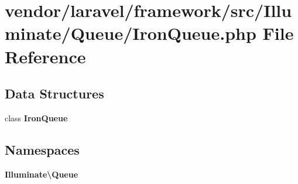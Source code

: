 \section{vendor/laravel/framework/src/\+Illuminate/\+Queue/\+Iron\+Queue.php File Reference}
\label{_iron_queue_8php}
\subsection*{Data Structures}
\begin{DoxyCompactItemize}
\item 
class {\bf Iron\+Queue}
\end{DoxyCompactItemize}
\subsection*{Namespaces}
\begin{DoxyCompactItemize}
\item 
 {\bf Illuminate\textbackslash{}\+Queue}
\end{DoxyCompactItemize}
